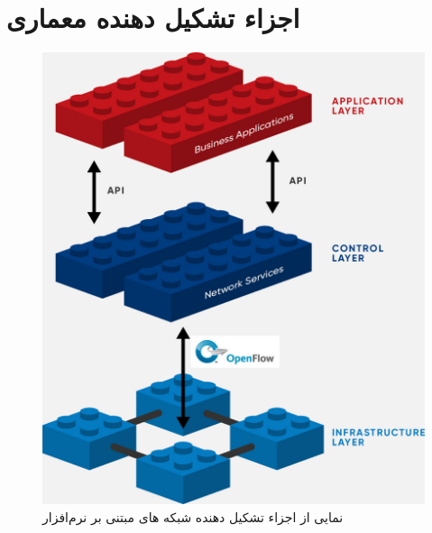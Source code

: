 \section{اجزاء تشکیل دهنده معماری }

\begin{figure}
	\centering
	\includegraphics[scale=0.4]{imgs/sdn-architecture-img.jpg}
	\caption{نمایی از اجزاء تشکیل دهنده شبکه های مبتنی بر نرم‌افزار}
	\label{fig2}
\end{figure}